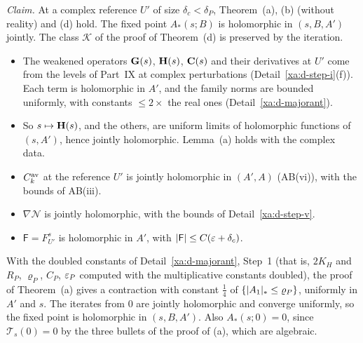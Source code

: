 \begin{detail}\label{xa:d-step-viii}
\emph{Claim.} At a complex reference $U'$ of size $\delta_c<\delta_P$, Theorem~(a), (b) (without reality) and (d) hold. The fixed point $A_*(s;B)$ is holomorphic in $(s,B,A')$ jointly. The class $\mathcal K$ of the proof of Theorem~(d) is preserved by the iteration.

\begin{step}
\begin{itemize}
\item The weakened operators $\mathbf G(s)$, $\mathbf H(s)$, $\mathbf C(s)$ and their derivatives at $U'$ come from the levels of Part~IX at complex perturbations (Detail~\ref{xa:d-step-i}(f)). Each term is holomorphic in $A'$, and the family norms are bounded uniformly, with constants $\le2\times$ the real ones (Detail~\ref{xa:d-majorant}).
\item So $s\mapsto\mathbf H(s)$, and the others, are uniform limits of holomorphic functions of $(s,A')$, hence jointly holomorphic. Lemma~(a) holds with the complex data.
\item $C^{\rm av}_k$ at the reference $U'$ is jointly holomorphic in $(A',A)$ (AB(vi)), with the bounds of AB(iii).
\item $\nabla\mathcal N$ is jointly holomorphic, with the bounds of Detail~\ref{xa:d-step-v}.
\item $\mathsf F=F^s_{U'}$ is holomorphic in $A'$, with $\lvert\mathsf F\rvert\le C(\varepsilon+\delta_c)$.
\end{itemize}
\end{step}

\begin{step}
With the doubled constants of Detail~\ref{xa:d-majorant}, Step~1 (that is, $2K_H$ and $R_P$, $\varrho_P$, $C_P$, $\varepsilon_P$ computed with the multiplicative constants doubled), the proof of Theorem~(a) gives a contraction with constant $\frac14$ of $\{\lvert A_1\rvert_*\le\varrho_P\}$, uniformly in $A'$ and $s$. The iterates from $0$ are jointly holomorphic and converge uniformly, so the fixed point is holomorphic in $(s,B,A')$. Also $A_*(s;0)=0$, since $\mathcal T_s(0)=0$ by the three bullets of the proof of (a), which are algebraic.
\end{step}


\end{detail}
